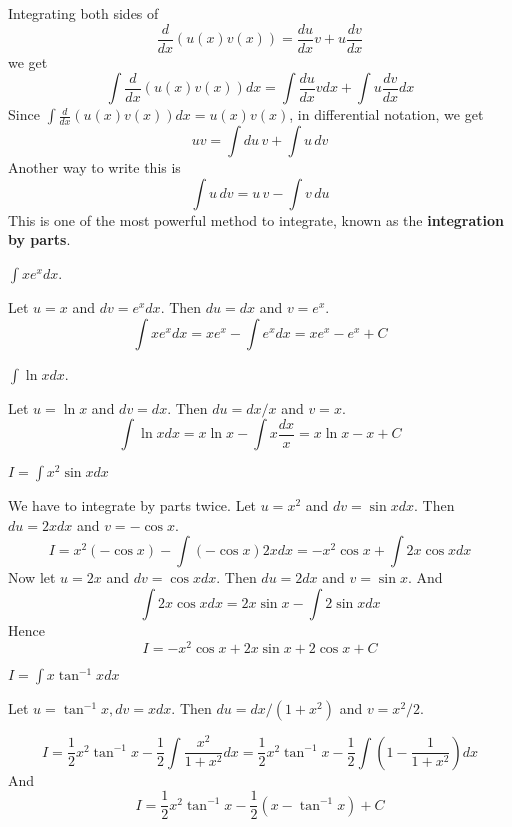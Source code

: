 \documentclass[../main.tex]{subfiles}
\begin{document}
Integrating both sides of 
\[
	\frac{d}{dx} (u(x) v(x)) = \frac{du}{dx} v + u \frac{dv}{dx}
\]
we get
\[
	\int \frac{d}{dx} (u(x) v(x)) dx = \int \frac{du}{dx} v dx + \int u \frac{dv}{dx} dx
\]
Since $\int \frac{d}{dx} (u(x) v(x)) dx = u(x) v(x)$, in differential notation, we get
\[
	u v = \int du \, v + \int u \, dv
\]
Another way to write this is
\[
	\int u \, dv = u\, v - \int v \, du
\]
This is one of the most powerful method to integrate, known as the \textbf{integration by parts}. 

\begin{example}
	$\displaystyle \int x e^x dx$.
\end{example}
\begin{solution}
	Let $u = x$ and $dv = e^x dx$. Then $du = dx$ and $v = e^x$.
	\[
		\int x e^x dx = x e^x - \int e^x dx = x e^x - e^x + C
	\]
\end{solution}

\begin{example}
	$\displaystyle \int \ln x dx$.
\end{example}
\begin{solution}
	Let $u = \ln x$ and $dv = dx$. Then $du = dx/x$ and $v = x$.
	\[
		\int \ln x dx = x \ln x - \int x \frac{dx}{x} = x \ln x - x + C
	\]
\end{solution}

\begin{example}
	$I=\displaystyle \int x^2 \sin x dx$
\end{example}
\begin{solution}
	We have to integrate by parts twice. Let $u = x^2$ and $dv = \sin x dx$. Then $du = 2x dx$ and $v = -\cos x$.
	\[
		I = x^2 (-\cos x) - \int (-\cos x) 2x dx = - x^2 \cos x + \int 2x \cos x dx
	\]
	Now let $u = 2x$ and $dv = \cos x dx$. Then $du = 2 dx$ and $v = \sin x$. And
	\[
		\int 2x \cos x dx = 2x \sin x - \int 2 \sin x dx
	\]
	Hence
	\[
		I = -x^2 \cos x + 2x \sin x +2 \cos x + C
	\]
\end{solution}

\begin{example}
	$I = \displaystyle \int x \tan^{-1} x dx$
\end{example}
\begin{solution}
	Let $u=\tan^{-1}x, dv = x dx$. Then $du = dx/(1+x^2)$ and $v = x^2/2$.

	\[
		I = \frac{1}{2} x^2 \tan^{-1}x -\frac{1}{2} \int \frac{x^2}{1+x^2} dx
		= \frac{1}{2} x^2 \tan^{-1}x -\frac{1}{2} \int \left( 1- \frac{1}{1+x^2} \right) dx
	\]
	And
	\[
		I = \frac{1}{2} x^2 \tan^{-1}x - \frac{1}{2} (x - \tan^{-1}x) + C
	\]
\end{solution}
\end{document}
